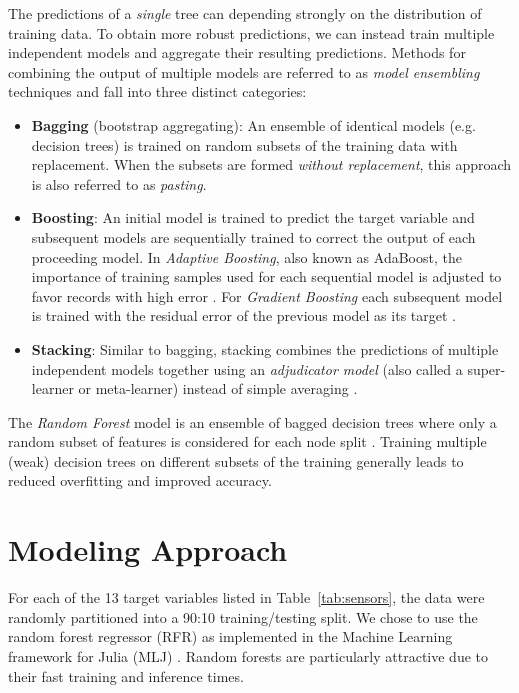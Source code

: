 The predictions of a \textit{single} tree can depending strongly on the
distribution of training data. To obtain more robust predictions, we can instead
train multiple independent models and aggregate their resulting predictions.
Methods for combining the output of multiple models are referred to as
\textit{model ensembling} techniques and fall into three distinct categories:
\begin{itemize}
  \item \textbf{Bagging} (bootstrap aggregating): An ensemble of identical
    models (e.g. decision trees) is trained on random subsets of the training
    data with replacement. When the subsets are formed \textit{without
      replacement}, this approach is also referred to as \textit{pasting}.
  \item \textbf{Boosting}: An initial model is trained to predict the target
    variable and subsequent models are sequentially trained to correct the
    output of each proceeding model. In \textit{Adaptive Boosting}, also known
    as AdaBoost, the importance of training samples used for each sequential
    model is adjusted to favor records with high error \cite{ada-boost}. For
    \textit{Gradient Boosting} each subsequent model is trained with the
    residual error of the previous model as its target \cite{gradient-boosting}.
  \item \textbf{Stacking}: Similar to bagging, stacking combines the predictions
    of multiple independent models together using an \textit{adjudicator model}
    (also called a super-learner or meta-learner) instead of simple averaging
    \cite{model-stacking}.
\end{itemize}

The \textit{Random Forest} model is an ensemble of bagged decision trees where
only a random subset of features is considered for each node split
\cite{random-forest}. Training multiple (weak) decision trees on different
subsets of the training generally leads to reduced overfitting and improved
accuracy.



\section{Modeling Approach}

For each of the 13 target variables listed in Table~\ref{tab:sensors}, the data
were randomly partitioned into a 90:10 training/testing split. We chose to use
the random forest regressor (RFR) as implemented in the Machine Learning
framework for Julia (MLJ) \cite{random-forest-regression, blaom2020mlj}.
Random forests are particularly attractive
due to their fast training and inference times.

